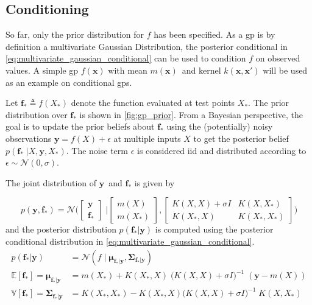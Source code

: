 \subsection{Conditioning}
So far, only the prior distribution for $f$ has been specified. As a \acrshort{gp} is by definition a multivariate Gaussian Distribution, the posterior conditional in \cref{eq:multivariate_gaussian_conditional} can be used to condition $f$ on observed values. A simple \acrshort{gp} $f(\boldsymbol{x})$ with mean $m(\boldsymbol{x})$ and kernel $k(\boldsymbol{x}, \boldsymbol{x}')$ will be used as an example on conditional \acrshort{gp}s.

Let $\boldsymbol{f}_* \triangleq f(X_*)$ denote the function evaluated at test points $X_*$. The prior distribution over $\boldsymbol{f_*}$ is shown in \cref{fig:gp_prior}. From a Bayesian perspective, the goal is to update the prior beliefs about $\boldsymbol{f}_*$ using the (potentially) noisy observations $\boldsymbol{y} = f(X) + \epsilon$ at multiple inputs $X$ to get the posterior belief $p(\boldsymbol{f}_* \; | X, \boldsymbol{y}, X_*)$. The noise term $\epsilon$ is considered \acrshort{iid} and distributed according to $\epsilon \sim \mathcal{N}(0, \sigma)$.

The joint distribution of $\boldsymbol{y}$ and $\boldsymbol{f}_*$ is given by 

\begin{equation}
    p(\boldsymbol{y}, \boldsymbol{f}_*) = \mathcal{N}\bigg(\begin{bmatrix}
        \boldsymbol{y} \\ \boldsymbol{f}_*
    \end{bmatrix} \; \bigg| \begin{bmatrix}
        m(X) \\ m(X_*)
    \end{bmatrix},  \begin{bmatrix}
        K(X, X) + \sigma I & K(X, X_*) \\ K(X_*, X) & K(X_*, X_*)
    \end{bmatrix}\bigg)
\end{equation}
and the posterior distribution $p(\boldsymbol{f}_* | \boldsymbol{y})$ is computed using the posterior conditional distribution in \cref{eq:multivariate_gaussian_conditional}.
\begin{subequations}\label{eq:gp_conditional}
\begin{align}
    p(\boldsymbol{f}_* | \boldsymbol{y}) &= \mathcal{N}(f \; | \; \boldsymbol{\mu}_{\boldsymbol{f}_*|\boldsymbol{y}}, \boldsymbol{\Sigma}_{\boldsymbol{f}_*|\boldsymbol{y}})\\
    \mathbb{E}[\boldsymbol{f}_*] =  \boldsymbol{\mu}_{\boldsymbol{f}_* | \boldsymbol{y}} &= m(X_*) + K(X_*, X) \; \big(K(X, X) + \sigma I\big)^{-1} \; (\boldsymbol{y} - m(X))\label{eq:gp_conditional_mean}\\
    \mathbb{V}[\boldsymbol{f}_*] = \boldsymbol{\Sigma}_{\boldsymbol{f}_* | \boldsymbol{y}} &= K(X_*, X_*) - K(X_*, X)  \big(K(X, X) + \sigma I\big)^{-1} \; K(X, X_*)\label{eq:gp_conditional_var}
\end{align}
\end{subequations}

